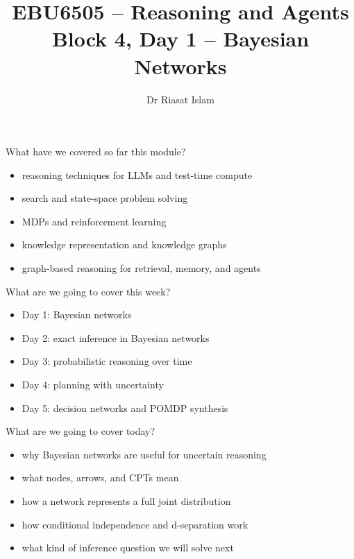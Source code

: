 \documentclass[aspectratio=169]{beamer}
\title[EBU6505 B4 D1]{EBU6505 -- Reasoning and Agents\\Block 4, Day 1 -- Bayesian Networks}
\author{Dr Riasat Islam}
\institute{Queen Mary University of London}
\date{}
\newcommand{\defaultdeckrefs}{AIMA4e Ch.12--13 pp.385--460; Poole3e Ch.9 pp.375--458}
\newcommand{\currentsliderefs}{\defaultdeckrefs}
\newcommand{\setslideref}[1]{\gdef\currentsliderefs{#1}}
\begin{document}
\setslideref{AIMA4e Ch.12--13 pp.385--460; Poole3e Ch.9 pp.375--458}
\begin{frame}
  \titlepage
\end{frame}

\begin{frame}{What have we covered so far this module?}
\begin{itemize}
  \item reasoning techniques for LLMs and test-time compute
  \item search and state-space problem solving
  \item MDPs and reinforcement learning
  \item knowledge representation and knowledge graphs
  \item graph-based reasoning for retrieval, memory, and agents
\end{itemize}
\end{frame}

\begin{frame}{What are we going to cover this week?}
\begin{itemize}
  \item Day 1: Bayesian networks
  \item Day 2: exact inference in Bayesian networks
  \item Day 3: probabilistic reasoning over time
  \item Day 4: planning with uncertainty
  \item Day 5: decision networks and POMDP synthesis
\end{itemize}
\end{frame}

\begin{frame}{What are we going to cover today?}
\begin{itemize}
  \item why Bayesian networks are useful for uncertain reasoning
  \item what nodes, arrows, and CPTs mean
  \item how a network represents a full joint distribution
  \item how conditional independence and d-separation work
  \item what kind of inference question we will solve next
\end{itemize}
\end{frame}
\end{document}
